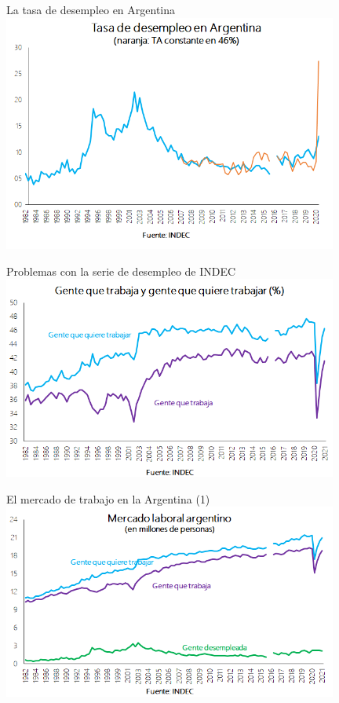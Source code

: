 \documentclass{beamer}
\begin{document}
\begin{frame}{La tasa de desempleo en Argentina}
\centering\includegraphics[width=11cm]{Figures/P34.png}
\end{frame}

\begin{frame}{Problemas con la serie de desempleo de INDEC}
\centering\includegraphics[width=11cm]{Figures/C30.15b.png}
\end{frame}

\begin{frame}{El mercado de trabajo en la Argentina (1)}
\centering\includegraphics[width=11cm]{Figures/C30.16b.png}
\end{frame}
\end{document}

